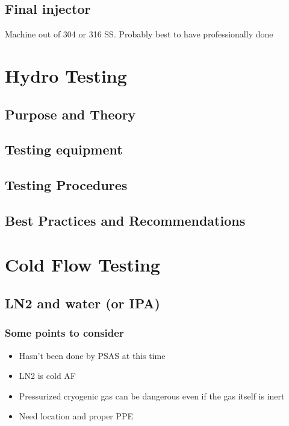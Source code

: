 \documentclass[11pt]{article}
\providecommand{\tightlist}{%
      \setlength{\itemsep}{0pt}\setlength{\parskip}{0pt}}
\begin{document}
\subsection{Final injector}\label{final-injector}

Machine out of 304 or 316 SS. Probably best to have professionally done

    \section{Hydro Testing}\label{hydro-testing}

\subsection{Purpose and Theory}\label{purpose-and-theory}

\subsection{Testing equipment}\label{testing-equipment}

\subsection{Testing Procedures}\label{testing-procedures}

\subsection{Best Practices and
Recommendations}\label{best-practices-and-recommendations}

    \section{Cold Flow Testing}\label{cold-flow-testing}

\subsection{LN2 and water (or IPA)}\label{ln2-and-water-or-ipa}

\subsubsection{Some points to consider}\label{some-points-to-consider}

\begin{itemize}
\tightlist
\item
  Hasn't been done by PSAS at this time
\item
  LN2 is cold AF
\item
  Pressurized cryogenic gas can be dangerous even if the gas itself is
  inert
\item
  Need location and proper PPE
\end{itemize}
\end{document}
